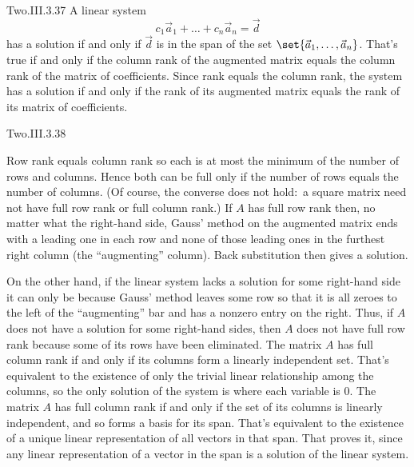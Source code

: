 \begin{ans}{Two.III.3.37}
      A linear system
      \begin{equation*}
        c_1\vec{a}_1+\dots+c_n\vec{a}_n=\vec{d}
      \end{equation*}
      has a solution if and only if \( \vec{d} \) is in the span of
      the set \( \set{\vec{a}_1,\dots,\vec{a}_n} \).
      That's true if and only if the column rank of the augmented matrix
      equals the column rank of the matrix of coefficients.
      Since rank equals the column rank, the system has a solution if and
      only if the rank of its augmented matrix equals the rank of its matrix
      of coefficients.
    
\end{ans}
\begin{ans}{Two.III.3.38}
      \begin{exparts}
        \partsitem Row rank equals column rank so each is at most the
          minimum of the number of rows and columns.
          Hence both can be full only if the number of rows equals the number
          of columns.
          (Of course, the converse does not hold:~a
          square matrix need not have full row rank or full column rank.)
        \partsitem If \( A \) has full row rank then, no matter what
          the right-hand
          side, Gauss' method on the augmented matrix ends with a leading
          one in each row and none of those leading ones in the
          furthest right column (the ``augmenting'' column).
          Back substitution then gives a solution.

          On the other hand, if the linear system lacks a solution for some
          right-hand side it can only be because Gauss' method leaves some row
          so that it is all zeroes to the left of the ``augmenting'' bar
          and has a nonzero entry on the right.
          Thus, if $A$ does not have a solution for some right-hand sides,
          then \( A \) does not have full row rank because some of its rows
          have been eliminated.
        \partsitem The matrix \( A \) has full column rank if and only
          if its columns
          form a linearly independent set.
          That's equivalent to the existence of only the trivial linear
          relationship among the columns, so the only solution of the
          system is where each variable is $0$.
        \partsitem The matrix \( A \) has full column rank if and only
          if the set of
          its columns is linearly independent, and so forms a basis for
          its span.
          That's equivalent to the existence of a unique linear representation
          of all vectors in that span.
          That proves it,
          since any linear representation of a vector in the span is a
          solution of the linear system.
      \end{exparts}
    
\end{ans}
